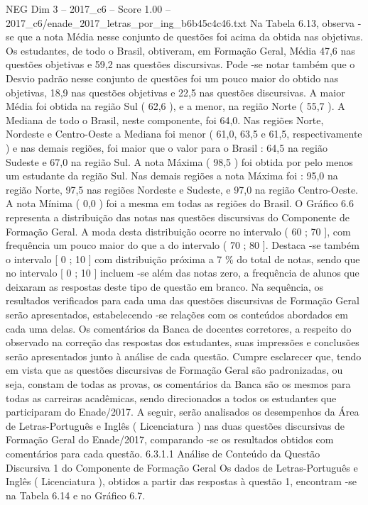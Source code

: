\begin{textsample}{NEG Dim 3 – 2017\_c6 – Score 1.00 – 2017\_c6/enade\_2017\_letras\_por\_ing\_b6b45c4c46.txt}
Na Tabela 6.13, observa -se que a nota Média nesse conjunto de questões foi acima da obtida nas objetivas.
Os estudantes, de todo o Brasil, obtiveram, em Formação Geral, Média 47,6 nas questões objetivas e 59,2 nas questões discursivas.
Pode -se notar também que o Desvio padrão nesse conjunto de questões foi um pouco maior do obtido nas objetivas, 18,9 nas questões objetivas e 22,5 nas questões discursivas.
A maior Média foi obtida na região Sul ( 62,6 ), e a menor, na região Norte ( 55,7 ).
A Mediana de todo o Brasil, neste componente, foi 64,0.
Nas regiões Norte, Nordeste e Centro-Oeste a Mediana foi menor ( 61,0, 63,5 e 61,5, respectivamente ) e nas demais regiões, foi maior que o valor para o Brasil : 64,5 na região Sudeste e 67,0 na região Sul.
A nota Máxima ( 98,5 ) foi obtida por pelo menos um estudante da região Sul.
Nas demais regiões a nota Máxima foi : 95,0 na região Norte, 97,5 nas regiões Nordeste e Sudeste, e 97,0 na região Centro-Oeste.
A nota Mínima ( 0,0 ) foi a mesma em todas as regiões do Brasil.
O Gráfico 6.6 representa a distribuição das notas nas questões discursivas do Componente de Formação Geral.
A moda desta distribuição ocorre no intervalo ( 60 ; 70 ], com frequência um pouco maior do que a do intervalo ( 70 ; 80 ].
Destaca -se também o intervalo [ 0 ; 10 ] com distribuição próxima a 7 \% do total de notas, sendo que no intervalo [ 0 ; 10 ] incluem -se além das notas zero, a frequência de alunos que deixaram as respostas deste tipo de questão em branco.
Na sequência, os resultados verificados para cada uma das questões discursivas de Formação Geral serão apresentados, estabelecendo -se relações com os conteúdos abordados em cada uma delas.
Os comentários da Banca de docentes corretores, a respeito do observado na correção das respostas dos estudantes, suas impressões e conclusões serão apresentados junto à análise de cada questão.
Cumpre esclarecer que, tendo em vista que as questões discursivas de Formação Geral são padronizadas, ou seja, constam de todas as provas, os comentários da Banca são os mesmos para todas as carreiras acadêmicas, sendo direcionados a todos os estudantes que participaram do Enade/2017.
A seguir, serão analisados os desempenhos da Área de Letras-Português e Inglês ( Licenciatura ) nas duas questões discursivas de Formação Geral do Enade/2017, comparando -se os resultados obtidos com comentários para cada questão. 6.3.1.1 Análise de Conteúdo da Questão Discursiva 1 do Componente de Formação Geral Os dados de Letras-Português e Inglês ( Licenciatura ), obtidos a partir das respostas à questão 1, encontram -se na Tabela 6.14 e no Gráfico 6.7.

\end{textsample}
